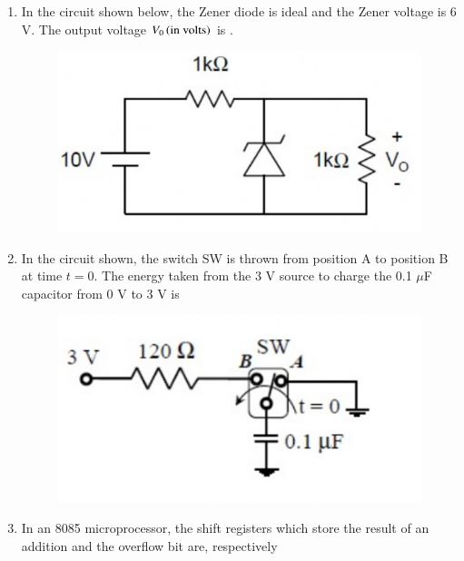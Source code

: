 \documentclass[a4paper, 11pt]{article}
\begin{document}
\begin{enumerate}
    \hfill{}

    \item In the circuit shown below, the Zener diode is ideal and the Zener voltage is 6 V. The output voltage $V_{0} \left(\text{in volts}\right)$ is \underline{\hspace{2cm}}.
    \begin{figure}[H]
        \centering
        \includegraphics[width=0.4\columnwidth]{figs/q22.png}
        \caption*{}
        \label{fig:q22}
    \end{figure}
    
    \hfill{}

    \item In the circuit shown, the switch SW is thrown from position A to position B at time $t=0$. The energy  taken from the 3 V source to charge the 0.1 $\mu$F capacitor from 0 V to 3 V is
    \begin{figure}[H]
        \centering
        \includegraphics[width=0.5\columnwidth]{figs/q23.png}
        \caption*{}
        \label{fig:q23}
    \end{figure}
    \begin{enumerate}
    \end{enumerate}
    
    \hfill{}

    \item In an 8085 microprocessor, the shift registers which store the result of an addition and the overflow bit are, respectively
    \begin{enumerate}
    \end{enumerate}
    

\end{enumerate}
\end{document}
